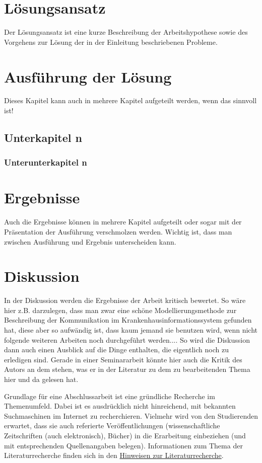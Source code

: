 \documentclass[headsepline,titlepage,twoside,12pt]{report}
\begin{document}
\chapter{Lösungsansatz}

Der Lösungsansatz ist eine kurze Beschreibung der Arbeitshypothese sowie des Vorgehens zur Lösung der in der Einleitung beschriebenen Probleme.

\chapter{Ausführung der Lösung}

Dieses Kapitel kann auch in mehrere Kapitel aufgeteilt werden, wenn das sinnvoll ist!

\section{Unterkapitel n}

\subsection{Unterunterkapitel n}

\chapter{Ergebnisse}

Auch die Ergebnisse können in mehrere Kapitel aufgeteilt oder sogar mit der Präsentation der Ausführung verschmolzen werden. Wichtig ist, dass man zwischen Ausführung und Ergebnis unterscheiden kann.


\chapter{Diskussion}

In der Diskussion werden die Ergebnisse der Arbeit kritisch bewertet.
So wäre hier z.B. darzulegen, dass man zwar eine schöne Modellierungsmethode zur Beschreibung der Kommunikation im Krankenhausinformationssystem gefunden hat, diese aber so aufwändig ist, dass kaum jemand sie benutzen wird, wenn nicht folgende weiteren Arbeiten noch durchgeführt werden.... So wird die Diskussion dann auch einen Ausblick auf die Dinge enthalten, die eigentlich noch zu erledigen sind.
Gerade in einer Seminararbeit könnte hier auch die Kritik des Autors an dem stehen, was er in der Literatur zu dem zu bearbeitenden Thema hier und da gelesen hat.


\newpage
Grundlage für eine Abschlussarbeit ist eine gründliche Recherche im Themenumfeld. Dabei ist es ausdrücklich nicht hinreichend, mit bekannten Suchmaschinen im Internet zu recherchieren. Vielmehr wird von den Studierenden erwartet, dass sie auch referierte Veröffentlichungen (wissenschaftliche Zeitschriften (auch elektronisch), Bücher) in die Erarbeitung einbeziehen (und mit entsprechenden Quellenangaben belegen). Informationen zum Thema der Literaturrecherche finden sich in den \href{http://www.imise.uni-leipzig.de/Lehre/MedInf/Abschlussarbeiten/Literaturrecherche.jsp}{Hinweisen zur Literaturrecherche}.
\end{document}
